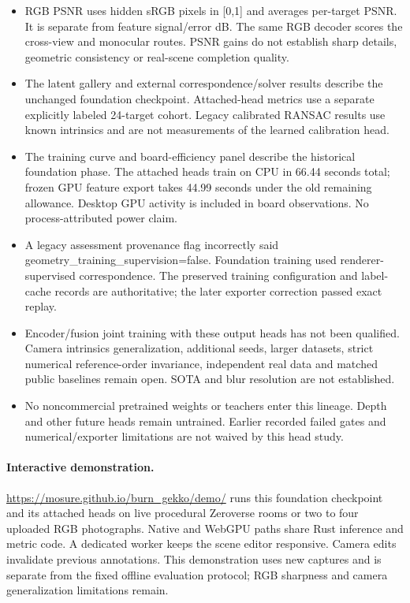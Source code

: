 \documentclass[10pt]{article}
\begin{document}
\begin{itemize}
\item RGB PSNR uses hidden sRGB pixels in [0,1] and averages per-target PSNR. It is separate from feature signal/error dB. The same RGB decoder scores the cross-view and monocular routes. PSNR gains do not establish sharp details, geometric consistency or real-scene completion quality.
\item The latent gallery and external correspondence/solver results describe the unchanged foundation checkpoint. Attached-head metrics use a separate explicitly labeled 24-target cohort. Legacy calibrated RANSAC results use known intrinsics and are not measurements of the learned calibration head.
\item The training curve and board-efficiency panel describe the historical foundation phase. The attached heads train on CPU in 66.44 seconds total; frozen GPU feature export takes 44.99 seconds under the old remaining allowance. Desktop GPU activity is included in board observations. No process-attributed power claim.
\item A legacy assessment provenance flag incorrectly said geometry\_training\_supervision=false. Foundation training used renderer-supervised correspondence. The preserved training configuration and label-cache records are authoritative; the later exporter correction passed exact replay.
\item Encoder/fusion joint training with these output heads has not been qualified. Camera intrinsics generalization, additional seeds, larger datasets, strict numerical reference-order invariance, independent real data and matched public baselines remain open. SOTA and blur resolution are not established.
\item No noncommercial pretrained weights or teachers enter this lineage. Depth and other future heads remain untrained. Earlier recorded failed gates and numerical/exporter limitations are not waived by this head study.
\end{itemize}

\paragraph{Interactive demonstration.} \url{https://mosure.github.io/burn_gekko/demo/} runs this foundation checkpoint and its attached heads on live procedural Zeroverse rooms or two to four uploaded RGB photographs. Native and WebGPU paths share Rust inference and metric code. A dedicated worker keeps the scene editor responsive. Camera edits invalidate previous annotations. This demonstration uses new captures and is separate from the fixed offline evaluation protocol; RGB sharpness and camera generalization limitations remain.
\end{document}
